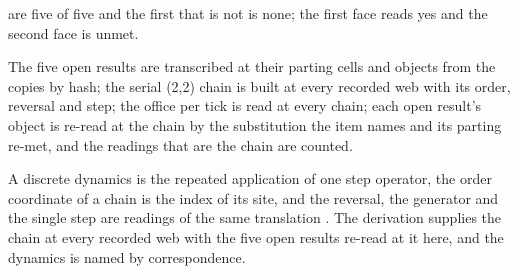 \begin{chconditional}
are five of five and the first that is not is none; the first face reads yes and the second face is unmet.
\end{chconditional}
The five open results are transcribed at their parting cells and objects from the copies by hash; the serial (2,2) chain is built at every recorded web with its order, reversal and step; the office per tick is read at every chain; each open result's object is re-read at the chain by the substitution the item names and its parting re-met, and the readings that are the chain are counted.

\begin{chbridge}
A discrete dynamics is the repeated application of one step operator, the order coordinate of a chain is the index of its site, and the reversal, the generator and the single step are readings of the same translation \cite{Feynman1982,tHooft2016}. The derivation supplies the chain at every recorded web with the five open results re-read at it here, and the dynamics is named by correspondence.
\end{chbridge}
